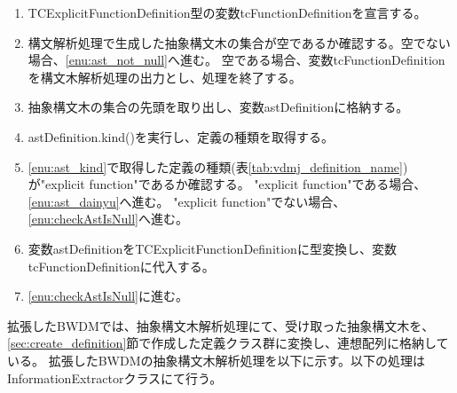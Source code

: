 \documentclass[uplatex, report, a4j, 10pt]{jsbook}
\begin{document}

\begin{enumerate}
  \item TCExplicitFunctionDefinition型の変数tcFunctionDefinitionを宣言する。
  \item\label{enu:checkAstIsNull} 構文解析処理で生成した抽象構文木の集合が空であるか確認する。空でない場合、\ref{enu:ast_not_null}へ進む。
        空である場合、変数tcFunctionDefinitionを構文木解析処理の出力とし、処理を終了する。
  \item\label{enu:ast_not_null} 抽象構文木の集合の先頭を取り出し、変数astDefinitionに格納する。
  \item\label{enu:ast_kind} astDefinition.kind()を実行し、定義の種類を取得する。
  \item \ref{enu:ast_kind}で取得した定義の種類(表\ref{tab:vdmj_definition_name})が"explicit function"であるか確認する。
        "explicit function"である場合、\ref{enu:ast_dainyu}へ進む。
        "explicit function"でない場合、\ref{enu:checkAstIsNull}へ進む。
  \item\label{enu:ast_dainyu} 変数astDefinitionをTCExplicitFunctionDefinitionに型変換し、変数tcFunctionDefinitionに代入する。
  \item \ref{enu:checkAstIsNull}に進む。
\end{enumerate}


拡張したBWDMでは、抽象構文木解析処理にて、受け取った抽象構文木を、\ref{sec:create_definition}節で作成した定義クラス群に変換し、連想配列に格納している。
拡張したBWDMの抽象構文木解析処理を以下に示す。以下の処理はInformationExtractorクラスにて行う。
\end{document}
